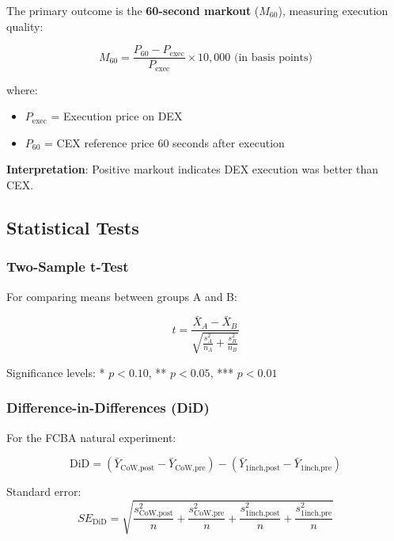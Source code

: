 \documentclass[11pt,a4paper]{article}
\begin{document}
The primary outcome is the \textbf{60-second markout} ($M_{60}$), measuring execution quality:

\begin{equation}
M_{60} = \frac{P_{60} - P_{\text{exec}}}{P_{\text{exec}}} \times 10,000 \text{ (in basis points)}
\end{equation}

where:
\begin{itemize}
    \item $P_{\text{exec}}$ = Execution price on DEX
    \item $P_{60}$ = CEX reference price 60 seconds after execution
\end{itemize}

\textbf{Interpretation}: Positive markout indicates DEX execution was better than CEX.

\subsection{Statistical Tests}

\subsubsection{Two-Sample t-Test}

For comparing means between groups A and B:

\begin{equation}
t = \frac{\bar{X}_A - \bar{X}_B}{\sqrt{\frac{s_A^2}{n_A} + \frac{s_B^2}{n_B}}}
\end{equation}

Significance levels: * $p < 0.10$, ** $p < 0.05$, *** $p < 0.01$

\subsubsection{Difference-in-Differences (DiD)}

For the FCBA natural experiment:

\begin{equation}
\text{DiD} = (\bar{Y}_{\text{CoW,post}} - \bar{Y}_{\text{CoW,pre}}) - (\bar{Y}_{\text{1inch,post}} - \bar{Y}_{\text{1inch,pre}})
\end{equation}

Standard error:
\begin{equation}
SE_{\text{DiD}} = \sqrt{\frac{s^2_{\text{CoW,post}}}{n} + \frac{s^2_{\text{CoW,pre}}}{n} + \frac{s^2_{\text{1inch,post}}}{n} + \frac{s^2_{\text{1inch,pre}}}{n}}
\end{equation}
\end{document}
